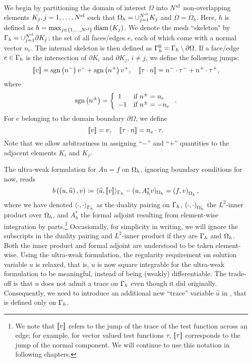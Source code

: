 We begin by partitioning the domain of interest $\Omega$ into $\Nel$ non-overlapping elements $K_j, j = 1,\hdots,\Nel$ such that $\Oh = \cup_{j=1}^\Nel K_j$ and $\overline{\Omega} = \overline{\Omega}_h$. Here, $h$ is defined as $h= \max_{j\in \LRc{1,\hdots,\Nel}}\text{diam}\LRp{K_j}$.  We denote the mesh ``skeleton" by $\Gh = \cup_{j=1}^\Nel \partial K_j$; the set of all faces/edges $e$, each of which come with a normal vector ${n}_e$. The internal skeleton is then defined as $\Gamma^0_h = \Gh \setminus \partial \Omega$. If a face/edge $e \in \Gh$ is the intersection of $\partial K_i$ and $\partial K_j$, $i \ne j$, we define the following jumps:
\[
\jump{v} = \text{sgn} \LRp{{n}^-}v^- + \text{sgn} \LRp{{n}^+}v^+, \quad
\jump{\tau \cdot n} = {n}^-\cdot \tau^- + {n}^+\cdot\tau^+,
\]
where
\[
\text{sgn}\LRp{{n}^{\pm}} =
\left\{
\begin{array}{ll}
1 & \text{if } {n}^{\pm} = {n}_e \\
-1 & \text{if } {n}^\pm = -{n}_e
\end{array}
\right..
\]
For $e$ belonging to the domain boundary $\partial \Omega$, we define
\[
\jump{v} = v, \quad
\jump{\tau \cdot n} = {n}_e\cdot \tau.
\]
Note that we allow arbitrariness in assigning ``$-$'' and ``$+$'' quantities to the adjacent elements $K_i$ and $K_j$.

The ultra-weak formulation for $Au = f$ on $\Oh$, ignoring boundary
conditions for now, reads
\begin{equation}
\eqnlab{uweak}
b\left(\left(u, \widehat{u}\right),v\right) \coloneqq \langle \widehat{u}, \jump{v}
\rangle_{\Gh} - (u,A_h^*v)_{\Oh}= \LRp{f,v}_{\Oh},
\end{equation}
where we have denoted $\LRa{\cdot,\cdot}_{\Gh}$ as the duality
pairing on $\Gh$, $\LRp{\cdot,\cdot}_{\Oh}$ the $L^2$-inner
product over $\Oh$, and $A_h^*$ the formal adjoint resulting from
element-wise integration by parts.\footnote{We note that $\jump{v}$ refers to the jump of the trace of the test function across an edge; for example, for vector valued test functions $\tau$, $\jump{\tau}$ corresponds to the jump of the normal component. We will continue to use this notation in following chapters.}
Occasionally, for simplicity in
writing, we will ignore the subscripts in the duality pairing and
$L^2$-inner product if they are $\Gh$ and $\Oh$. Both the
inner product and formal adjoint are understood to be taken
element-wise. Using the ultra-weak formulation, the regularity
requirement on solution variable $u$ is relaxed, that is, $u$ is now
square integrable for the ultra-weak formulation  to be
meaningful, instead of being (weakly) differentiable.  The trade-off
is that $u$ does not admit a trace on $\Gh$ even though it did
originally. Consequently, we need to introduce an additional new
``trace'' variable $\widehat{u}$ in , that is defined only on
$\Gh$.

